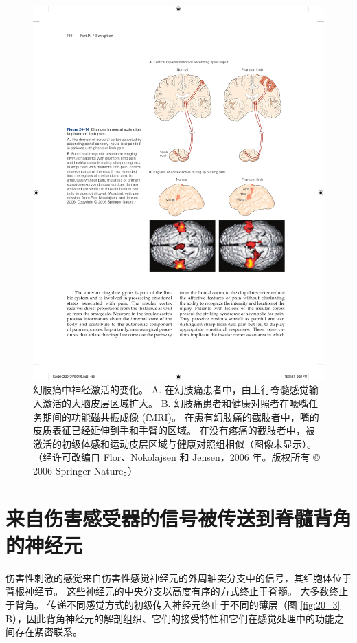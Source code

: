 \begin{figure}[htbp]
	\centering
	\includegraphics[width=0.7\linewidth]{chap20/fig_20_14}
	\caption{幻肢痛中神经激活的变化。 
		A. 在幻肢痛患者中，由上行脊髓感觉输入激活的大脑皮层区域扩大。 
		B. 幻肢痛患者和健康对照者在噘嘴任务期间的功能磁共振成像 (fMRI)。 
		在患有幻肢痛的截肢者中，嘴的皮质表征已经延伸到手和手臂的区域。 
		在没有疼痛的截肢者中，被激活的初级体感和运动皮层区域与健康对照组相似（图像未显示）。 （经许可改编自 Flor、Nokolajsen 和 Jensen，2006 年。版权所有 © 2006 Springer Nature。）}
	\label{fig:20_14}
\end{figure}


\section{来自伤害感受器的信号被传送到脊髓背角的神经元}
伤害性刺激的感觉来自伤害性感觉神经元的外周轴突分支中的信号，其细胞体位于背根神经节。
这些神经元的中央分支以高度有序的方式终止于脊髓。 
大多数终止于背角。
传递不同感觉方式的初级传入神经元终止于不同的薄层（图 \ref{fig:20_3} B），因此背角神经元的解剖组织、它们的接受特性和它们在感觉处理中的功能之间存在紧密联系。


